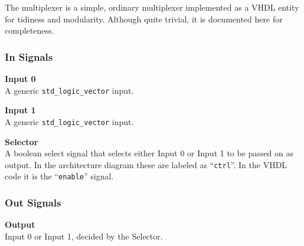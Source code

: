 The multiplexer is a simple, ordinary multiplexer implemented as a VHDL entity for tidiness and modularity.
Although quite trivial, it is documented here for completeness.

\subsubsection{In Signals}

\begin{description}
\item{\textbf{Input 0}} \\
A generic \texttt{std\_logic\_vector} input.

\item{\textbf{Input 1}} \\
A generic \texttt{std\_logic\_vector} input.

\item{\textbf{Selector}} \\
A boolean select signal that selects either Input 0 or Input 1 to be passed on as output.
In the architecture diagram these are labeled as ``\texttt{ctrl}''. 
In the VHDL code it is the ``\texttt{enable}'' signal.

\end{description}

\subsubsection{Out Signals}

\begin{description}
\item{\textbf{Output}} \\
Input 0 or Input 1, decided by the Selector.
\end{description}
